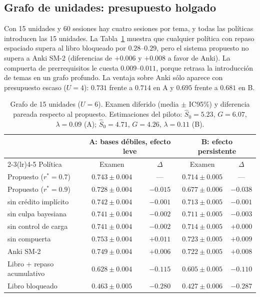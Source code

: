 \documentclass[11pt]{article}
\theoremstyle{definition}
\theoremstyle{remark}
\newcommand{\Sh}{\hat S}
\newcommand{\rstar}{r^{\ast}}
\begin{document}
\subsection{Grafo de unidades: presupuesto holgado}

Con 15 unidades y 60 sesiones hay cuatro sesiones por tema, y todas las políticas introducen las 15 unidades. La Tabla~\ref{tab:unidades} muestra que cualquier política con repaso espaciado supera al libro bloqueado por $0.28$--$0.29$, pero el sistema propuesto no supera a Anki SM-2 (diferencias de $+0.006$ y $+0.008$ a favor de Anki). La compuerta de prerrequisitos le cuesta $0.009$--$0.011$, porque retrasa la introducción de temas en un grafo profundo. La ventaja sobre Anki sólo aparece con presupuesto escaso ($U=4$): $0.731$ frente a $0.714$ en A y $0.695$ frente a $0.681$ en B.

\begin{table}[t]
\centering\small
\caption{Grafo de 15 unidades ($U=6$). Examen diferido (media $\pm$ IC95\%) y diferencia pareada respecto al propuesto. Estimaciones del piloto: $\Sh_0=5.23$, $G=6.07$, $\lambda=0.09$ (A); $\Sh_0=4.71$, $G=4.26$, $\lambda=0.11$ (B).}
\label{tab:unidades}
\begin{tabular}{lcccc}
\toprule
& \multicolumn{2}{c}{A: bases débiles, efecto leve} & \multicolumn{2}{c}{B: efecto persistente} \\
\cmidrule(lr){2-3}\cmidrule(lr){4-5}
Política & Examen & $\Delta$ & Examen & $\Delta$ \\
\midrule
Propuesto ($\rstar=0.7$) & $0.743\pm0.004$ & --- & $0.714\pm0.005$ & --- \\
Propuesto ($\rstar=0.9$) & $0.728\pm0.004$ & $-0.015$ & $0.677\pm0.006$ & $-0.038$ \\
\quad sin crédito implícito & $0.742\pm0.004$ & $-0.001$ & $0.713\pm0.005$ & $-0.001$ \\
\quad sin culpa bayesiana & $0.741\pm0.004$ & $-0.002$ & $0.711\pm0.005$ & $-0.003$ \\
\quad sin control de carga & $0.741\pm0.004$ & $-0.002$ & $0.714\pm0.005$ & $+0.000$ \\
\quad sin compuerta & $0.753\pm0.004$ & $+0.011$ & $0.723\pm0.005$ & $+0.009$ \\
Anki SM-2 & $0.749\pm0.004$ & $+0.006$ & $0.722\pm0.005$ & $+0.008$ \\
Libro + repaso acumulativo & $0.628\pm0.004$ & $-0.115$ & $0.605\pm0.005$ & $-0.110$ \\
Libro bloqueado & $0.463\pm0.005$ & $-0.280$ & $0.427\pm0.006$ & $-0.287$ \\
\bottomrule
\end{tabular}
\end{table}
\end{document}
